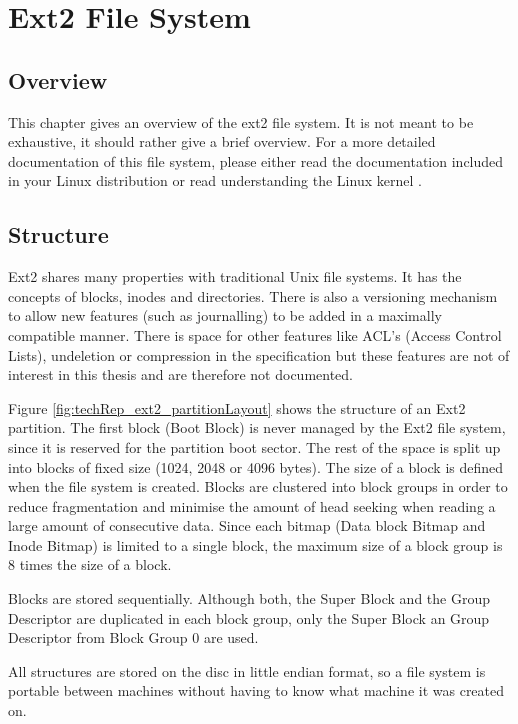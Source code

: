 \chapter{Ext2 File System}
\label{cha:ext2FileSystem}

\section{Overview}
This chapter gives an overview of the ext2 file system. It is not meant to be exhaustive, it should rather give a brief overview. For a more detailed documentation of this file system, please either read the documentation included in your Linux distribution or read understanding the Linux kernel \cite{understandingKernel}.

\section{Structure}
Ext2 shares many properties with traditional Unix file systems.  It has the concepts of blocks, inodes and directories. There is also a versioning mechanism to allow new features (such as journalling) to be added in a maximally compatible manner. There is space for other features like ACL's (Access Control Lists), undeletion or compression in the specification but these features are not of interest in this thesis and are therefore not documented.

Figure \ref{fig:techRep_ext2_partitionLayout} shows the structure of an Ext2 partition. The first block (Boot Block) is never managed by the Ext2 file system, since it is reserved for the partition boot sector. The rest of the space is split up into blocks of fixed size (1024, 2048 or 4096 bytes). The size of a block is defined when the file system is created. Blocks are clustered into block groups in order to reduce fragmentation and minimise the amount of head seeking when reading a large amount of consecutive data. Since each bitmap (Data block Bitmap and Inode Bitmap) is limited to a single block, the maximum size of a block group is 8 times the size of a block.

Blocks are stored sequentially. Although both, the Super Block and the Group Descriptor are duplicated in each block group, only the Super Block an Group Descriptor from Block Group 0 are used.

All structures are stored on the disc in little endian format, so a file system is portable between machines without having to know what machine it was created on.


